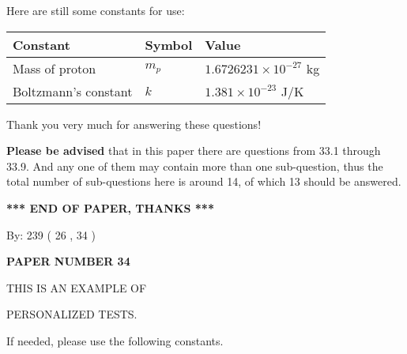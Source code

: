 \documentclass[12pt]{article}
\begin{document}
 
 
   
   
 \vspace{0.2in}
Here are still some constants for use:
 
 
\noindent\begin{tabular}{|l|l|l|}
\hline
Constant & Symbol & Value \\
\hline
 
Mass of proton &
$m_p$ &
 $ 1.6726231 \times 10^{-27} $
kg \\
\hline
 
Boltzmann's constant &
$k$ &
 $ 1.381 \times 10^{-23} $
J/K \\
\hline
 
\end{tabular}
 
Thank you very much for answering these questions!
 
{\textbf{\large{Please be advised}}} that in this paper there are questions from
33.1 through
33.9.
And any one of them may contain more than one sub-question, thus the total number
of sub-questions here is around 14, of which
13 should be answered.
 
   
   
   
   
\vspace{1.0in} 
{\textbf{\large{ *** END OF PAPER, THANKS *** }}} 
   
   
\hspace{1.0in} By: 
         239 (          26 ,           34 )
   
   
   
   
\newpage 
\setcounter{page}{ 
    34001 } 
   
   
   
   
 {\textbf{ \Large{ PAPER NUMBER           34  }}}
   
   
\vspace{0.2in}
   
   
   
   
   
   
 \vspace{0.2in}
 
 
{\Huge  THIS IS AN EXAMPLE OF}
 
{\Huge  PERSONALIZED TESTS. }
 
If needed, please use the following constants.
 
\end{document}
